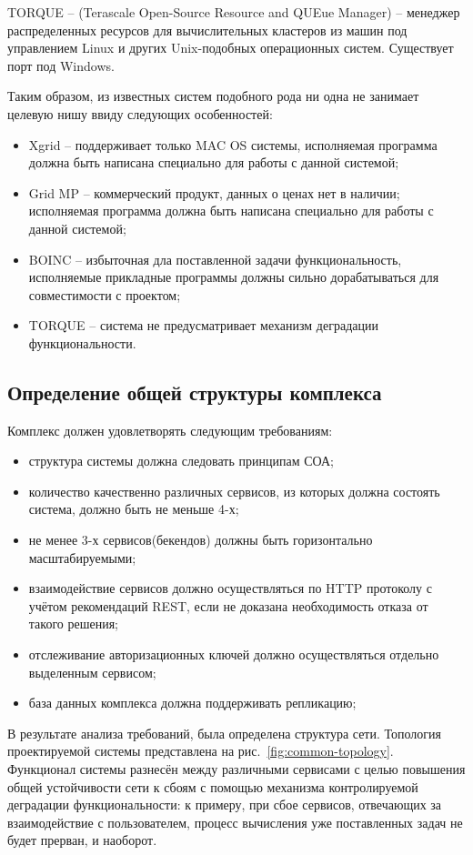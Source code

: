\documentclass[a4paper,12pt]{report}
\numberwithin{equation}{section}
\begin{document}
  TORQUE\cite{torque} -- (Terascale Open-Source Resource and QUEue Manager) -- менеджер распределенных ресурсов для вычислительных кластеров из машин под управлением Linux и других Unix-подобных операционных систем. Существует порт под Windows.
  
  Таким образом, из известных систем подобного рода ни одна не занимает целевую нишу ввиду следующих особенностей: 
  \begin{itemize}
    \item Xgrid -- поддерживает только MAC OS системы, исполняемая программа должна быть написана специально для работы с данной системой;
    \item Grid MP -- коммерческий продукт, данных о ценах нет в наличии; исполняемая программа должна быть написана специально для работы с данной системой;
    \item BOINC -- избыточная дла поставленной задачи функциональность, исполняемые прикладные программы должны сильно дорабатываться для совместимости с проектом;
    \item TORQUE -- система не предусматривает механизм деградации функциональности.
  \end{itemize}
  
  \subsection{Определение общей структуры комплекса}
  Комплекс должен удовлетворять следующим требованиям:
  
  \begin{itemize}
    \item структура системы должна следовать принципам СОА;
    \item количество качественно различных сервисов, из которых должна состоять система, должно быть не меньше 4-х;
    \item не менее 3-х сервисов(бекендов) должны быть горизонтально масштабируемыми;
    \item взаимодействие сервисов должно осуществляться по HTTP протоколу с учётом рекомендаций REST, если не доказана необходимость отказа от такого решения;
    \item отслеживание авторизационных ключей должно осуществляться отдельно выделенным сервисом;
    \item база данных комплекса должна поддерживать репликацию; 
  \end{itemize}
  
  В результате анализа требований, была определена структура сети.
  Топология проектируемой системы представлена на рис.~\ref{fig:common-topology}.
  Функционал системы разнесён между различными сервисами с целью повышения общей устойчивости сети к сбоям с помощью механизма контролируемой деградации функциональности: к примеру, при сбое сервисов, отвечающих за взаимодействие с пользователем, процесс вычисления уже поставленных задач не будет прерван, и наоборот.
  
\end{document}

